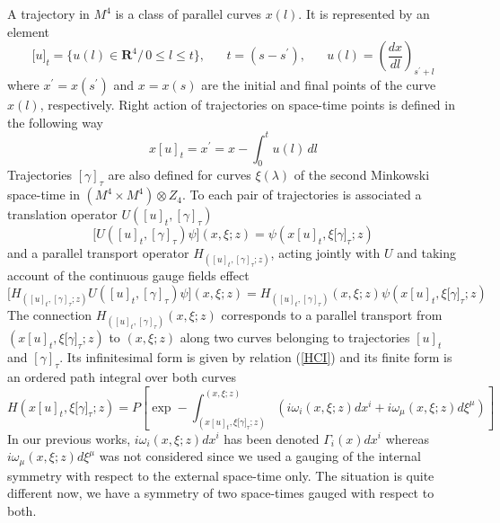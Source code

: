 \documentclass[12pt,a4paper]{article}
\begin{document}
A trajectory in $M^{4}$ is a class of parallel curves $x(l)$. It is
represented by an element
\begin{equation}
\lbrack u]_{t}=\{u(l)\in\mathbf{R}^{4}/\,0\leq l\leq
t\},\;\;\;\;\;\;t=(s-s^{\prime}),\;\;\;\;\;\;u(l)=(\frac{dx}{dl})_{s^{\prime
}+l}%
\end{equation}
where $x^{\prime}=x(s^{\prime})$ and $x=x(s)$ are the initial and final points
of the curve $x\left(  l\right)  $, respectively. Right action of trajectories
on space-time points is defined in the following way
\begin{equation}
x[u]_{t}=x^{\prime}=x-\int_{0}^{t}u(l)\,dl\label{ex}%
\end{equation}
Trajectories $[\gamma]_{\tau}$ are also defined for curves $\xi\left(
\lambda\right)  $ of the second Minkowski space-time in $\left(  M^{4}\times
M^{4}\right)  \otimes Z_{4}$. To each pair of trajectories is associated a
translation operator $U([u]_{t},[\gamma]_{\tau})$
\begin{equation}
\lbrack U([u]_{t},[\gamma]_{\tau})\psi](x,\xi;z)=\psi(x[u]_{t},\xi
\lbrack\gamma]_{\tau};z)
\end{equation}
and a parallel transport operator $H_{([u]_{t},[\gamma]_{\tau};z)}$, acting
jointly with $U$ and taking account of the continuous gauge fields effect
\begin{equation}
\lbrack H_{([u]_{t},[\gamma]_{\tau};z)}U([u]_{t},[\gamma]_{\tau})\psi
](x,\xi;z)=H_{([u]_{t},[\gamma]_{\tau})}(x,\xi;z)\psi(x[u]_{t},\xi
\lbrack\gamma]_{\tau};z)
\end{equation}
The connection $H_{([u]_{t},[\gamma]_{\tau})}(x,\xi;z)$ corresponds to a
parallel transport from $(x[u]_{t},\xi\lbrack\gamma]_{\tau};z)$ to $(x,\xi;z)$
along two curves belonging to trajectories $[u]_{t}$ and $[\gamma]_{\tau}$.
Its infinitesimal form is given by relation (\ref{HCI}) and its finite form is
an ordered path integral over both curves
\begin{equation}
H(x[u]_{t},\xi\lbrack\gamma]_{\tau};z)=P\left[  \exp-\int_{(x[u]_{t}%
,\xi\lbrack\gamma]_{\tau};z)}^{(x,\xi;z)}\left(  i\omega_{i}\left(
x,\xi;z\right)  dx^{i}+i\omega_{\mu}\left(  x,\xi;z\right)  d\xi^{\mu}\right)
\right]
\end{equation}
In our previous works, $i\omega_{i}\left(  x,\xi;z\right)  dx^{i}$ has been
denoted $\Gamma_{i}\left(  x\right)  dx^{i}$ whereas $i\omega_{\mu}\left(
x,\xi;z\right)  d\xi^{\mu}$ was not considered since we used a gauging of the
internal symmetry with respect to the external space-time only. The situation
is quite different now, we have a symmetry of two space-times gauged with
respect to both.
\end{document}
